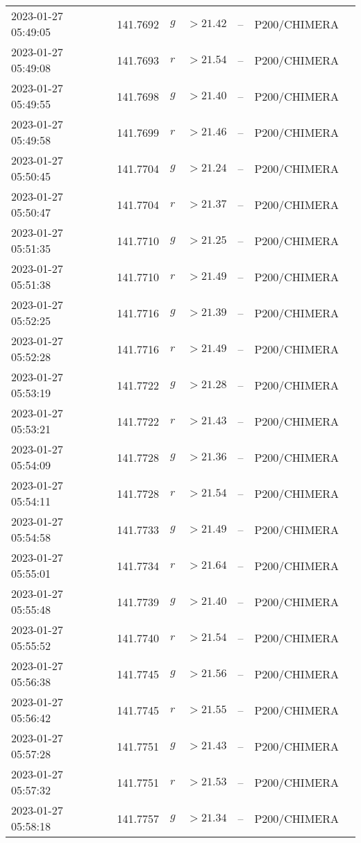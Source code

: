 \documentclass{nature_plusfigure}
\begin{document}
\begin{supplement}
\begin{center}
\begin{longtable}{lllllll}
2023-01-27 05:49:05 & 141.7692 & $g$ & $>21.42$ & -- & P200/CHIMERA &  \\ 
2023-01-27 05:49:08 & 141.7693 & $r$ & $>21.54$ & -- & P200/CHIMERA &  \\ 
2023-01-27 05:49:55 & 141.7698 & $g$ & $>21.40$ & -- & P200/CHIMERA &  \\ 
2023-01-27 05:49:58 & 141.7699 & $r$ & $>21.46$ & -- & P200/CHIMERA &  \\ 
2023-01-27 05:50:45 & 141.7704 & $g$ & $>21.24$ & -- & P200/CHIMERA &  \\ 
2023-01-27 05:50:47 & 141.7704 & $r$ & $>21.37$ & -- & P200/CHIMERA &  \\ 
2023-01-27 05:51:35 & 141.7710 & $g$ & $>21.25$ & -- & P200/CHIMERA &  \\ 
2023-01-27 05:51:38 & 141.7710 & $r$ & $>21.49$ & -- & P200/CHIMERA &  \\ 
2023-01-27 05:52:25 & 141.7716 & $g$ & $>21.39$ & -- & P200/CHIMERA &  \\ 
2023-01-27 05:52:28 & 141.7716 & $r$ & $>21.49$ & -- & P200/CHIMERA &  \\ 
2023-01-27 05:53:19 & 141.7722 & $g$ & $>21.28$ & -- & P200/CHIMERA &  \\ 
2023-01-27 05:53:21 & 141.7722 & $r$ & $>21.43$ & -- & P200/CHIMERA &  \\ 
2023-01-27 05:54:09 & 141.7728 & $g$ & $>21.36$ & -- & P200/CHIMERA &  \\ 
2023-01-27 05:54:11 & 141.7728 & $r$ & $>21.54$ & -- & P200/CHIMERA &  \\ 
2023-01-27 05:54:58 & 141.7733 & $g$ & $>21.49$ & -- & P200/CHIMERA &  \\ 
2023-01-27 05:55:01 & 141.7734 & $r$ & $>21.64$ & -- & P200/CHIMERA &  \\ 
2023-01-27 05:55:48 & 141.7739 & $g$ & $>21.40$ & -- & P200/CHIMERA &  \\ 
2023-01-27 05:55:52 & 141.7740 & $r$ & $>21.54$ & -- & P200/CHIMERA &  \\ 
2023-01-27 05:56:38 & 141.7745 & $g$ & $>21.56$ & -- & P200/CHIMERA &  \\ 
2023-01-27 05:56:42 & 141.7745 & $r$ & $>21.55$ & -- & P200/CHIMERA &  \\ 
2023-01-27 05:57:28 & 141.7751 & $g$ & $>21.43$ & -- & P200/CHIMERA &  \\ 
2023-01-27 05:57:32 & 141.7751 & $r$ & $>21.53$ & -- & P200/CHIMERA &  \\ 
2023-01-27 05:58:18 & 141.7757 & $g$ & $>21.34$ & -- & P200/CHIMERA &  \\ 

\end{longtable}
\end{center}
\end{supplement}
\end{document}
